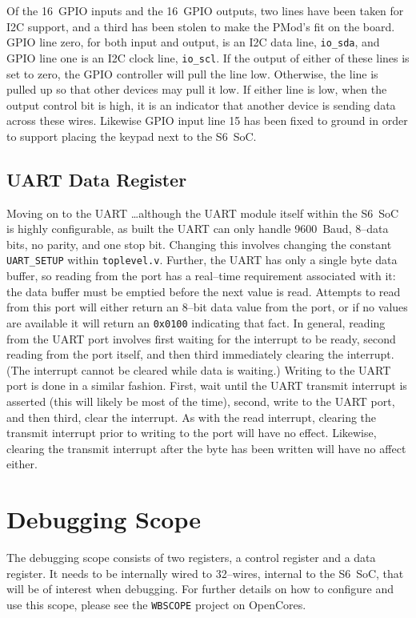 \documentclass{gqtekspec}
\begin{document}
Of the 16~GPIO inputs and the 16~GPIO outputs, two lines have been taken for
I2C support, and a third has been stolen to make the PMod's fit on the
board.  GPIO line zero, for both input and output, is an I2C data line,
{\tt io\_sda}, and GPIO line one is an I2C clock line, {\tt io\_scl}.  If the
output of either of these lines is set to zero, the GPIO controller will pull
the line low.  Otherwise, the line is pulled up so that other devices may pull
it low.  If either line is low, when the output control bit is high,
it is an indicator that another device is sending data across these wires.
Likewise GPIO input line 15 has been fixed to ground in order to support
placing the keypad next to the S6~SoC.

\subsection{UART Data Register}
Moving on to the UART \ldots although the UART module itself
within the S6~SoC is highly configurable, as built
the UART can only handle 9600~Baud, 8--data bits, no parity, and one stop bit.
Changing this involves changing the constant {\tt UART\_SETUP} within
{\tt toplevel.v}. 
Further,  the UART has only a single byte data buffer, so
reading from the port has a real--time requirement associated with it: the
data buffer must be emptied before the next value is read.
Attempts to read from this port will either return an 8--bit data value from
the port, or if no values are available it will return an {\tt 0x0100}
indicating that fact.  In general, reading from the UART port involves first
waiting for the interrupt to be ready, second reading from the port itself,
and then third immediately  clearing the interrupt.  (The interrupt cannot
be cleared while data is waiting.)  Writing to the UART port is done in a
similar fashion.  First, wait until the UART transmit interrupt is asserted
(this will likely be most of the time), second, write to the UART port, and
then third, clear the interrupt.  As with the read interrupt, clearing the
transmit interrupt prior to writing to the port will have no effect.  Likewise,
clearing the transmit interrupt after the byte has been written will have no
affect either.

\section{Debugging Scope}
The debugging scope consists of two registers, a control register and a data
register.  It needs to be internally wired to 32--wires, internal to the
S6~SoC, that will be of interest when debugging.  For further details on how
to configure and use this scope, please see the {\tt WBSCOPE} project on
OpenCores.
\end{document}
